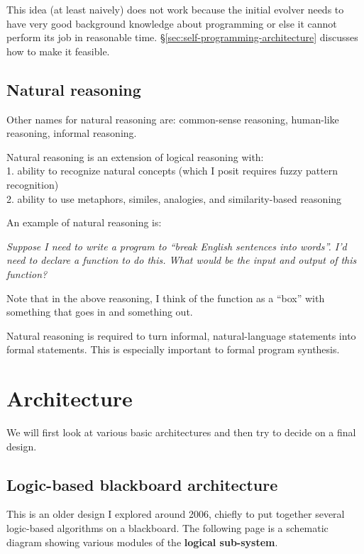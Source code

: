 \documentclass[a4paper]{report}
\begin{document}
This idea (at least naively) does not work because the initial evolver needs to have very good background knowledge about programming or else it cannot perform its job in reasonable time.  \S\ref{sec:self-programming-architecture} discusses how to make it feasible.

\section{Natural reasoning}
\label{sec:natural-reasoning}

Other names for natural reasoning are: common-sense reasoning, human-like reasoning, informal reasoning.

Natural reasoning is an extension of logical reasoning with:\\
1.  ability to recognize natural concepts (which I posit requires fuzzy pattern recognition)\\
2.  ability to use metaphors, similes, analogies, and similarity-based reasoning

An example of natural reasoning is:

\leftskip 1cm \textit{Suppose I need to write a program to ``break English sentences into words''.  I'd need to declare a function to do this.  What would be the input and output of this function?}

\leftskip 0cm Note that in the above reasoning, I think of the function as a ``box'' with something that goes in and something out.

Natural reasoning is required to turn informal, natural-language statements into formal statements.  This is especially important to formal program synthesis.

\chapter{Architecture}
\minitoc

We will first look at various basic architectures and then try to decide on a final design.

\section{Logic-based blackboard architecture}

This is an older design I explored around 2006, chiefly to put together several logic-based algorithms on a blackboard.  The following page is a schematic diagram showing various modules of the \textbf{logical sub-system}.
\end{document}
